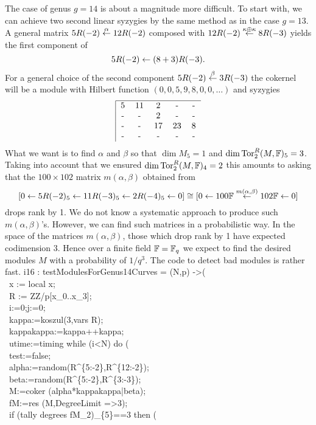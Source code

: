 \medskip
The case of genus $g=14$ is about a magnitude more difficult. 
To start with, we can achieve two second linear syzygies by the same method as 
in the case $g=13$. 
A general matrix 
$5R(-2) \stackrel{\alpha}{\leftarrow} 12R(-2)$ composed with 
$12R(-2) \stackrel{\kappa \oplus \kappa}{\leftarrow} 8R(-3)$ 
yields the first component of
$$5R(-2) \leftarrow (8+3)R(-3).$$
For a general choice of the second component 
$5R(-2) \stackrel{\beta}{ \leftarrow} 3R(-3)$ the cokernel
will be a module with Hilbert function $(0,0,5,9,8,0,0,\ldots)$ and syzygies
$$
\begin{tabular}{|ccccc}\hline
5 & 11 & 2 & - & -  \cr
- & - & 2 & - & - \cr
- & - & 17 & 23 & 8  \cr
- & - & - & - & - \cr
\end{tabular}
$$
What we want is to find $\alpha$ and $\beta$ so that $\dim M_5 = 1$ 
and $\dim {\rm{Tor}}_2^R(M,{\mathbb F})_5 = 3$.
Taking into account that we ensured $\dim {\rm{Tor}}_2^R(M,{\mathbb F})_4 =2$
this amounts to asking that the $100 \times 102$ matrix $m(\alpha,\beta)$ 
obtained from
$$[0 \leftarrow 5R(-2)_5 \leftarrow 11R(-3)_5 \leftarrow 2R(-4)_5 \leftarrow 0] 
\cong [0 \leftarrow 100 {\mathbb F} \stackrel{m(\alpha,\beta)} {\leftarrow} 102 {\mathbb F} \leftarrow 0]$$
drops rank by 1. 
We do not know a systematic approach to produce such 
$m(\alpha,\beta)$'s.
However, we can find such matrices in a probabilistic way.
In the space of the matrices $m(\alpha,\beta)$, 
those which drop rank by 1 have expected codimension 3.
Hence over a finite field ${\mathbb F}={\mathbb F}_q$ we expect to find the desired modules $M$
with a probability of $1/q^3$. 
The code to detect bad modules is rather fast.
\beginOutput
i16 : testModulesForGenus14Curves = (N,p) ->(\\
\           x := local x;\\
\           R := ZZ/p[x_0..x_3];\\
\           i:=0;j:=0;\\
\           kappa:=koszul(3,vars R);\\
\           kappakappa:=kappa++kappa;\\
\           utime:=timing while (i<N) do (\\
\                test:=false;\\
\                alpha:=random(R^\{5:-2\},R^\{12:-2\});\\
\                beta:=random(R^\{5:-2\},R^\{3:-3\});\\
\                M:=coker (alpha*kappakappa|beta);\\
\                fM:=res (M,DegreeLimit =>3);\\
\                if (tally degrees fM_2)_\{5\}==3 then (\\
